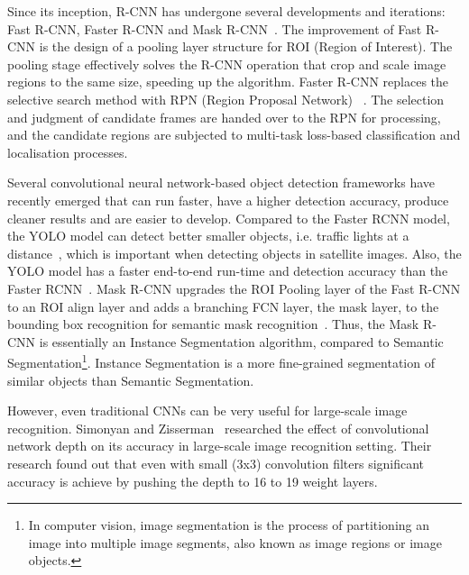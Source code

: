 Since its inception, R-CNN has undergone several developments and iterations: Fast R-CNN, Faster R-CNN and Mask R-CNN~\cite{girshick2015fast, ren2015faster, he2017mask}. The improvement of Fast R-CNN is the design of a pooling layer structure for ROI (Region of Interest). The pooling stage effectively solves the R-CNN operation that crop and scale image regions to the same size, speeding up the algorithm. Faster R-CNN replaces the selective search method with RPN (Region Proposal Network) ~\cite{ren2015faster}. The selection and judgment of candidate frames are handed over to the RPN for processing, and the candidate regions are subjected to multi-task loss-based classification and localisation processes. 

Several convolutional neural network-based object detection frameworks have recently emerged that can run faster, have a higher detection accuracy, produce cleaner results and are easier to develop. Compared to the Faster RCNN model, the YOLO model can detect better smaller objects, i.e. traffic lights at a distance~\cite{Dwivedi2020YOLOv5}, which is important when detecting objects in satellite images. Also, the YOLO model has a faster end-to-end run-time and detection accuracy than the Faster RCNN~\cite{Dwivedi2020YOLOv5}. Mask R-CNN upgrades the ROI Pooling layer of the Fast R-CNN to an ROI align layer and adds a branching FCN layer, the mask layer, to the bounding box recognition for semantic mask recognition~\cite{he2017mask}. Thus, the Mask R-CNN is essentially an Instance Segmentation algorithm, compared to Semantic Segmentation\footnote{In computer vision, image segmentation is the process of partitioning an image into multiple image segments, also known as image regions or image objects.}. Instance Segmentation is a more fine-grained segmentation of similar objects than Semantic Segmentation.

However, even traditional CNNs can be very useful for large-scale image recognition. Simonyan and Zisserman~\cite{Simonyan2015VeryDC} researched the effect of convolutional network depth on its accuracy in large-scale image recognition setting. Their research found out that even with small (3x3) convolution filters significant accuracy is achieve by pushing the depth to 16 to 19 weight layers.
